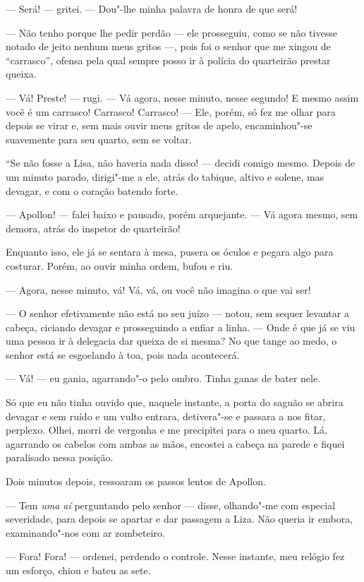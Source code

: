 --- Será! --- gritei. --- Dou"-lhe minha palavra de honra de que será!

--- Não tenho porque lhe pedir perdão --- ele prosseguiu, como se não
tivesse notado de jeito nenhum meus gritos ---, pois foi o senhor que me
xingou de ``carrasco'', ofensa pela qual sempre posso ir à polícia do
quarteirão prestar queixa.

--- Vá! Preste! --- rugi. --- Vá agora, nesse minuto, nesse segundo! E mesmo
assim você é um carrasco! Carrasco! Carrasco! --- Ele, porém, só fez me
olhar para depois se virar e, sem mais ouvir meus gritos de apelo,
encaminhou"-se suavemente para seu quarto, sem se voltar.

``Se não fosse a Lisa, não haveria nada disso! --- decidi comigo mesmo.
Depois de um minuto parado, dirigi"-me a ele, atrás do tabique, altivo e
solene, mas devagar, e com o coração batendo forte.

--- Apollon! --- falei baixo e pausado, porém arquejante. --- Vá agora mesmo,
sem demora, atrás do inspetor de quarteirão!

Enquanto isso, ele já se sentara à mesa, pusera os óculos e pegara algo
para costurar. Porém, ao ouvir minha ordem, bufou e riu.

--- Agora, nesse minuto, vá! Vá, vá, ou você não imagina o que vai ser!

--- O senhor efetivamente não está no seu juízo --- notou, sem sequer
levantar a cabeça, ciciando devagar e prosseguindo a enfiar a linha. ---
Onde é que já se viu uma pessoa ir à delegacia dar queixa de si mesma?
No que tange ao medo, o senhor está se esgoelando à toa, pois nada
acontecerá.

--- Vá! --- eu gania, agarrando"-o pelo ombro. Tinha ganas de bater nele.

Só que eu não tinha ouvido que, naquele instante, a porta do saguão se
abrira devagar e sem ruído e um vulto entrara, detivera"-se e passara a
nos fitar, perplexo. Olhei, morri de vergonha e me precipitei para o meu
quarto. Lá, agarrando os cabelos com ambas as mãos, encostei a cabeça na
parede e fiquei paralisado nessa posição.

Dois minutos depois, ressoaram os passos lentos de Apollon.

--- Tem \emph{uma aí} perguntando pelo senhor --- disse, olhando"-me com
especial severidade, para depois se apartar e dar passagem a Liza. Não
queria ir embora, examinando"-nos com ar zombeteiro.

--- Fora! Fora! --- ordenei, perdendo o controle. Nesse instante, meu
relógio fez um esforço, chiou e bateu as sete.

